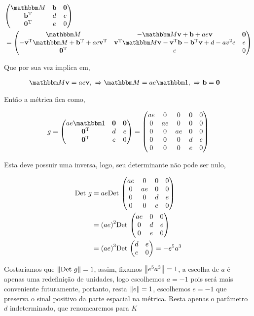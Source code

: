\documentclass[twoside]{amsart}
\numberwithin{equation}{section}
\begin{document}
\begin{align}
    &\mqty(\mathbbm M&\vb b&\vb 0\\\vb b^{\textup T}&d&e\\\vb 0^{\textup T}&e&0)\\
    &=\mqty(\mathbbm M&-\mathbbm M \vb v+\vb b+ae\vb v&\vb 0\\ -\vb v^{\textup T}\mathbbm M+\vb b^{\textup T}+ae\vb v^{\textup T}&\vb v^{\textup T}\mathbbm M\vb v-\vb v^{\textup T}\vb b-\vb b^{\textup T}\vb v+d-av^2e&e\\ \vb 0^{\textup T}&e&0)
\end{align}

Que por sua vez implica em,

\begin{align}
    \mathbbm M \vb v&= ae\vb v,\ \Rightarrow \mathbbm M=ae\mathbbm 1,\ \Rightarrow \vb b=\vb 0
\end{align}

Então a métrica fica como,

\begin{align}
    g=\mqty(ae\mathbbm 1&\vb 0&\vb 0\\\vb 0^{\textup T}&d&e\\\vb 0^{\textup T}&e&0 )=\mqty(ae &0&0&0&0\\0&ae&0&0&0\\0&0&ae&0&0\\0&0&0&d&e\\0&0&0&e&0)
\end{align}

Esta deve possuir uma inversa, logo, seu determinante não pode ser nulo,

\begin{align}
    \textup{Det }g&=ae\textup{Det }\mqty(ae&0&0&0\\0&ae&0&0\\0&0&d&e\\0&0&e&0)\\
    &=\qty(ae)^2\textup{Det }\mqty(ae&0&0\\0&d&e\\0&e&0)\\
    &=\qty(ae)^3\textup{Det }\mqty(d&e\\e&0)=-e^5a^3
\end{align}

Gostaríamos que $\norm{\textup{Det }g}=1$, assim, fixamos $\norm{e^5a^3}=1$, a escolha de $a$ é apenas uma redefinição de unidades, logo escolhemos $a=-1$ pois será mais conveniente futuramente, portanto, resta $\norm{e}=1$, escolhemos $e=-1$ que preserva o sinal positivo da parte espacial na métrica. Resta apenas o parâmetro $d$ indeterminado, que renomearemos para $K$
\end{document}
